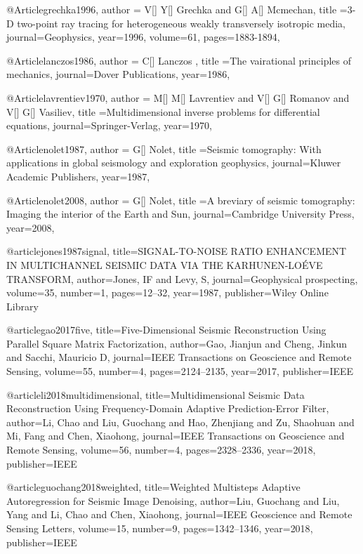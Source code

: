 @Article{grechka1996,
  author = {V[] Y[] Grechka and G[] A[] Mcmechan},
  title ={3-D two-point ray tracing for heterogeneous weakly transversely isotropic media},
  journal={Geophysics},
  year=1996,
  volume=61,
  pages={1883-1894},
}

@Article{lanczos1986,
  author = {C[] Lanczos },
  title ={The vairational principles of mechanics},
  journal={Dover Publications},
  year=1986,
}

@Article{lavrentiev1970,
  author = {M[] M[] Lavrentiev and V[] G[] Romanov and V[] G[] Vasiliev},
  title ={Multidimensional inverse problems for differential equations},
  journal={Springer-Verlag},
  year=1970,
}

@Article{nolet1987,
  author = {G[] Nolet},
  title ={Seismic tomography: With applications in global seismology and exploration geophysics},
  journal={Kluwer Academic Publishers},
  year=1987,
}

@Article{nolet2008,
  author = {G[] Nolet},
  title ={A breviary of seismic tomography: Imaging the interior of the Earth and Sun},
  journal={Cambridge University Press},
  year=2008,
}

@article{jones1987signal,
  title={SIGNAL-TO-NOISE RATIO ENHANCEMENT IN MULTICHANNEL SEISMIC DATA VIA THE KARHUNEN-LO{\'E}VE TRANSFORM},
  author={Jones, IF and Levy, S},
  journal={Geophysical prospecting},
  volume={35},
  number={1},
  pages={12--32},
  year={1987},
  publisher={Wiley Online Library}
}

@article{gao2017five,
  title={Five-Dimensional Seismic Reconstruction Using Parallel Square Matrix Factorization},
  author={Gao, Jianjun and Cheng, Jinkun and Sacchi, Mauricio D},
  journal={IEEE Transactions on Geoscience and Remote Sensing},
  volume={55},
  number={4},
  pages={2124--2135},
  year={2017},
  publisher={IEEE}
}

@article{li2018multidimensional,
  title={Multidimensional Seismic Data Reconstruction Using Frequency-Domain Adaptive Prediction-Error Filter},
  author={Li, Chao and Liu, Guochang and Hao, Zhenjiang and Zu, Shaohuan and Mi, Fang and Chen, Xiaohong},
  journal={IEEE Transactions on Geoscience and Remote Sensing},
  volume={56},
  number={4},
  pages={2328--2336},
  year={2018},
  publisher={IEEE}
}

@article{guochang2018weighted,
  title={Weighted Multisteps Adaptive Autoregression for Seismic Image Denoising},
  author={Liu, Guochang and Liu, Yang and Li, Chao and Chen, Xiaohong},
  journal={IEEE Geoscience and Remote Sensing Letters},
  volume={15},
  number={9},
  pages={1342--1346},
  year={2018},
  publisher={IEEE}
}


